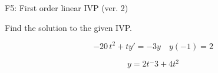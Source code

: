 \begin{exercise}
  \begin{exerciseTitle}F5: First order linear IVP (ver. 2)\end{exerciseTitle}
  \begin{exerciseStatement}
    
Find the solution to the given IVP.

    
\[-20 \, t^{2} +ty'= -3 y \hspace{1em} y( -1 ) = 2\]

  \end{exerciseStatement}
  \begin{exerciseAnswer}
    
\[y= 2 t^ -3 +4 t^{2}\]

  \end{exerciseAnswer}
\end{exercise}